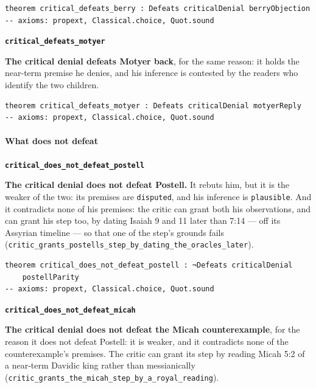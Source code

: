 \documentclass[11pt]{article}
\begin{document}
{\small\begin{verbatim}
theorem critical_defeats_berry : Defeats criticalDenial berryObjection
-- axioms: propext, Classical.choice, Quot.sound
\end{verbatim}}
\par\medskip\noindent\textbf{\texttt{critical\_\allowbreak{}defeats\_\allowbreak{}motyer}}\par\nobreak\noindent
\textbf{The critical denial defeats Motyer back}, for the same reason: it holds the near-term premise he denies, and his inference is contested by the readers who identify the two children.

{\small\begin{verbatim}
theorem critical_defeats_motyer : Defeats criticalDenial motyerReply
-- axioms: propext, Classical.choice, Quot.sound
\end{verbatim}}
\paragraph*{What does not defeat}
\leavevmode\par
\par\medskip\noindent\textbf{\texttt{critical\_\allowbreak{}does\_\allowbreak{}not\_\allowbreak{}defeat\_\allowbreak{}postell}}\par\nobreak\noindent
\textbf{The critical denial does not defeat Postell.} It rebuts him, but it is the weaker of the two: its premises are \texttt{disputed}, and his inference is \texttt{plausible}. And it contradicts none of his premises: the critic can grant both his observations, and can grant his step too, by dating Isaiah 9 and 11 later than 7:14 — off its Assyrian timeline — so that one of the step's grounds fails (\texttt{critic\_\allowbreak{}grants\_\allowbreak{}postells\_\allowbreak{}step\_\allowbreak{}by\_\allowbreak{}dating\_\allowbreak{}the\_\allowbreak{}oracles\_\allowbreak{}later}).

{\small\begin{verbatim}
theorem critical_does_not_defeat_postell : ¬Defeats criticalDenial
    postellParity
-- axioms: propext, Classical.choice, Quot.sound
\end{verbatim}}
\par\medskip\noindent\textbf{\texttt{critical\_\allowbreak{}does\_\allowbreak{}not\_\allowbreak{}defeat\_\allowbreak{}micah}}\par\nobreak\noindent
\textbf{The critical denial does not defeat the Micah counterexample}, for the reason it does not defeat Postell: it is weaker, and it contradicts none of the counterexample's premises. The critic can grant its step by reading Micah 5:2 of a near-term Davidic king rather than messianically (\texttt{critic\_\allowbreak{}grants\_\allowbreak{}the\_\allowbreak{}micah\_\allowbreak{}step\_\allowbreak{}by\_\allowbreak{}a\_\allowbreak{}royal\_\allowbreak{}reading}).
\end{document}
